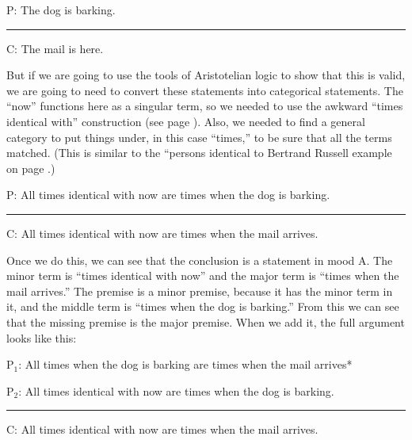 \begin{earg}
\item[P:] The dog is barking.
\vspace{-.5em}
\item [] \rule{0.2\linewidth}{.5pt} 
\item[C:] The mail is here.
\end{earg} 

But if we are going to use the tools of Aristotelian logic to show that this is valid, we are going to need to convert these statements into categorical statements. The ``now'' functions here as a singular term, so we needed to use the awkward ``times identical with'' construction (see page \pageref{subsec:singular_propositions}). Also, we needed to find a general category to put things under, in this case ``times,'' to be sure that all the terms matched. (This is similar to the ``persons identical to Bertrand Russell example on page \pageref{finding_general_terms}.) 

\begin{earg}
\item[P:] All times identical with now are times when the dog is barking.
\vspace{-.5em}
\item [] \rule{0.7\linewidth}{.5pt} 
\item[C:] All times identical with now are times when the mail arrives.
\end{earg} 

Once we do this, we can see that the conclusion is a statement in mood A. The minor term is ``times identical with now'' and the major term is ``times when the mail arrives.'' The premise is a minor premise, because it has the minor term in it, and the middle term is ``times when the dog is barking.'' From this we can see that the missing premise is the major premise. When we add it, the full argument looks like this:

\begin{earg}
\item[P$_1$:] All times when the dog is barking are times when the mail arrives*
\item[P$_2$:] All times identical with now are times when the dog is barking.
\vspace{-.5em}
\item [] \rule{0.7\linewidth}{.5pt} 
\item[C:] All times identical with now are times when the mail arrives.
\end{earg} 

